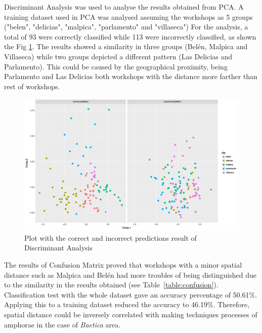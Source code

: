 \documentclass[review]{elsarticle}
\begin{document}
Discriminant Analysis was used to analyse the results obtained from PCA.  A training dataset used in PCA was analysed assuming the workshops as 5 groups ("belen", "delicias", "malpica", "parlamento" and "villaseca") For the analysis, a total of 93 were correctly classified while 113 were incorrectly classified, as shown the Fig \ref{prediction}. The results showed a similarity in three groups (Bel\'en, Malpica and Villaseca) while two groups depicted a different pattern (Las Delicias and Parlamento). This could be caused by the geographical proximity, being Parlamento and Las Delicias both workshops with the distance more farther than rest of workshops. 

\begin{figure}[htp]
	\centering
\includegraphics[scale=0.35]{prediction.png}
\caption{Plot with the correct and incorrect predictions result of Discriminant Analysis}
\label{prediction}
\end{figure} 

The results of Confusion Matrix proved that workshops with a minor spatial distance such as Malpica and Bel\'en had more troubles of being distinguished due to the similarity in the results obtained (see Table~\ref{table:confusion}). Classification test with the whole dataset gave an accuracy percentage of 50.61\%. Applying this to a training dataset reduced the accuracy to 46.19\%. Therefore, spatial distance could be inversely correlated with making techniques processes of amphorae in the case of \textit{Baetica} area. 
\end{document}
